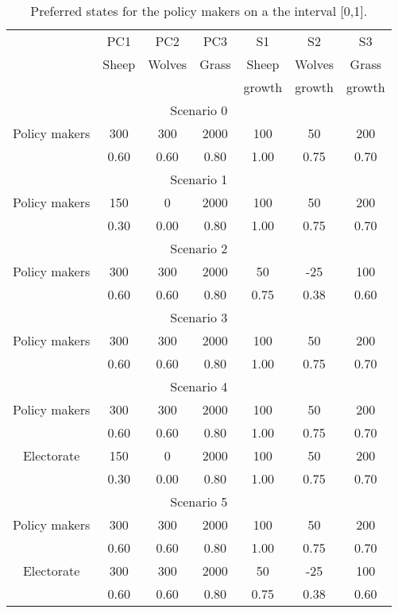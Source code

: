 \documentclass[12pt]{article}
\begin{document}
\begin{table}[h!]
\begin{center}
\begin{tabular}{ |c|c|c|c|c|c|c| } 
\hline

			& PC1	& PC2	& PC3	& S1		& S2		& S3  	\\ 
			& Sheep	& Wolves	& Grass	& Sheep	& Wolves	& Grass 	\\
			&		&		&		& growth	& growth	& growth	\\ \hline
			
\multicolumn{7}{|c|}{Scenario 0}										\\ \hline
Policy makers	& 300	& 300	& 2000	& 100	& 50		& 200	\\ \hline
			& 0.60	& 0.60	& 0.80	& 1.00	& 0.75	& 0.70	\\ \hline
			
\multicolumn{7}{|c|}{Scenario 1}										\\ \hline
Policy makers	& 150	& 0		& 2000	& 100	& 50		& 200	\\ \hline
			& 0.30	& 0.00	& 0.80	& 1.00	& 0.75	& 0.70	\\ \hline
			
\multicolumn{7}{|c|}{Scenario 2}										\\ \hline
Policy makers	& 300	& 300	& 2000	& 50		& -25	& 100	\\ \hline
			& 0.60	& 0.60	& 0.80	& 0.75	& 0.38	& 0.60	\\ \hline

\multicolumn{7}{|c|}{Scenario 3}										\\ \hline
Policy makers	& 300	& 300	& 2000	& 100	& 50		& 200	\\ \hline
			& 0.60	& 0.60	& 0.80	& 1.00	& 0.75	& 0.70	\\ \hline
			
\multicolumn{7}{|c|}{Scenario 4}										\\ \hline
Policy makers	& 300	& 300	& 2000	& 100	& 50		& 200	\\ \hline
			& 0.60	& 0.60	& 0.80	& 1.00	& 0.75	& 0.70	\\ \hline
Electorate		& 150	& 0		& 2000	& 100	& 50		& 200	\\ \hline
			& 0.30	& 0.00	& 0.80	& 1.00	& 0.75	& 0.70	\\ \hline


\multicolumn{7}{|c|}{Scenario 5}										\\ \hline
Policy makers	& 300	& 300	& 2000	& 100	& 50		& 200	\\ \hline
			& 0.60	& 0.60	& 0.80	& 1.00	& 0.75	& 0.70	\\ \hline
Electorate		& 300	& 300	& 2000	& 50		& -25	& 100	\\ \hline
			& 0.60	& 0.60	& 0.80	& 0.75	& 0.38	& 0.60	\\ \hline

\end{tabular}
\end{center}
\caption{Preferred states for the policy makers on a the interval [0,1].}
\label{tab:preferredStates}
\end{table}
\end{document}
